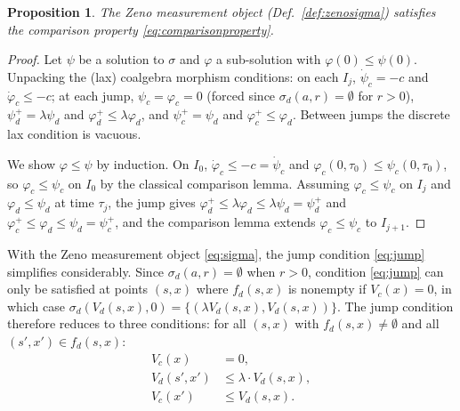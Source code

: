\documentclass[letterpaper, 10 pt, conference]{IEEEconf}
\newtheorem{prop}[thm]{Proposition}
\theoremstyle{definition}
\begin{document}
\begin{prop}
\label{prop:comparisonminusc}
    The Zeno measurement object (Def.~\ref{def:zenosigma}) satisfies the comparison property \eqref{eq:comparisonproperty}.
\end{prop}
\begin{proof}
    Let $\psi$ be a solution to $\sigma$ and $\varphi$ a sub-solution with $\varphi(0) \leq \psi(0)$. Unpacking the (lax) coalgebra morphism conditions: on each $I_j$, $\dot{\psi}_c = -c$ and $\dot{\varphi}_c \leq -c$; at each jump, $\psi_c = \varphi_c = 0$ (forced since $\sigma_d(a,r) = \emptyset$ for $r > 0$), $\psi_d^+ = \lambda\psi_d$ and $\varphi_d^+ \leq \lambda\varphi_d$, and $\psi_c^+ = \psi_d$ and $\varphi_c^+ \leq \varphi_d$. Between jumps the discrete lax condition is vacuous.

    We show $\varphi \leq \psi$ by induction. On $I_0$, $\dot{\varphi}_c \leq -c = \dot{\psi}_c$ and $\varphi_c(0,\tau_0) \leq \psi_c(0,\tau_0)$, so $\varphi_c \leq \psi_c$ on $I_0$ by the classical comparison lemma. Assuming $\varphi_c \leq \psi_c$ on $I_j$ and $\varphi_d \leq \psi_d$ at time $\tau_j$, the jump gives $\varphi_d^+ \leq \lambda\varphi_d \leq \lambda\psi_d = \psi_d^+$ and $\varphi_c^+ \leq \varphi_d \leq \psi_d = \psi_c^+$, and the comparison lemma extends $\varphi_c \leq \psi_c$ to $I_{j+1}$.
\end{proof}

With the Zeno measurement object \eqref{eq:sigma}, the jump condition \eqref{eq:jump} simplifies considerably. Since $\sigma_d(a, r) = \emptyset$ when $r > 0$, condition \eqref{eq:jump} can only be satisfied at points $(s,x)$ where $f_d(s,x)$ is nonempty if $V_c(x) = 0$, in which case $\sigma_d(V_d(s,x), 0) = \{(\lambda V_d(s,x), V_d(s,x))\}$. The jump condition therefore reduces to three conditions: for all $(s,x)$ with $f_d(s,x) \neq \emptyset$ and all $(s',x') \in f_d(s,x)$:
\begin{align}
    V_c(x) &= 0, \label{eq:jump_vc0} \\
    V_d(s',x') &\leq \lambda \cdot V_d(s,x), \label{eq:jump_vd} \\
    V_c(x') &\leq V_d(s,x). \label{eq:jump_vc}
\end{align}
\end{document}
